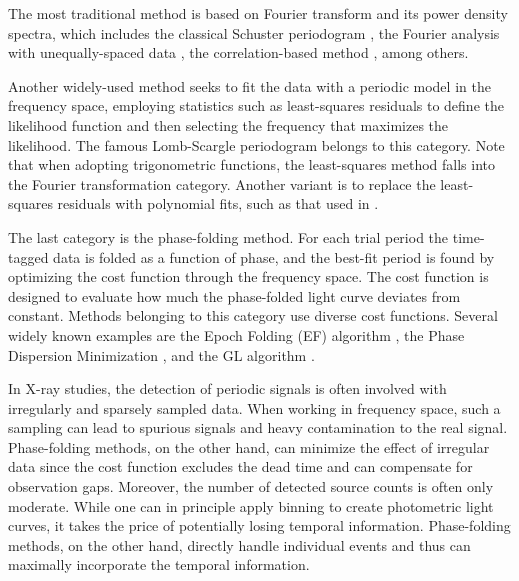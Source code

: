 \documentclass[fleqn,usenatbib]{mnras}
\begin{document}
The most traditional method is based on Fourier transform and its power density spectra, which includes the classical Schuster periodogram \citep{1898TeMag...3...13S}, the Fourier analysis with unequally-spaced data \citep{1975Ap&SS..36..137D}, the correlation-based method \citep{1988ApJ...333..646E}, among others.

Another widely-used method seeks to fit the data with a periodic model in the frequency space, employing statistics such as least-squares residuals to define the likelihood function and then selecting the frequency that maximizes the likelihood. The famous Lomb-Scargle periodogram \citep[hereafter LS]{1976Ap&SS..39..447L,1982ApJ...263..835S} belongs to this category. Note that when adopting trigonometric functions, the least-squares method falls into the Fourier transformation category. Another variant is to replace the least-squares residuals with polynomial fits, such as that used in \citet{1996ApJ...460L.107S}.

The last category is the phase-folding method. For each trial period the time-tagged data is folded as a function of phase, and the best-fit period is found by optimizing the cost function through the frequency space. The cost function is designed to evaluate how much the phase-folded light curve deviates from constant.
Methods belonging to this category use diverse cost functions. Several widely known examples are the Epoch Folding (EF) algorithm \citep{1983ApJ...266..160L}, the Phase Dispersion Minimization \citep{1978ApJ...224..953S}, and the GL algorithm \citep{1992ApJ...398..146G}.

In X-ray studies, the detection of periodic signals is often involved with irregularly and sparsely sampled data. 
When working in frequency space, such a sampling can lead to spurious signals and heavy contamination to the real signal. Phase-folding methods, on the other hand, can minimize the effect of irregular data since the cost function excludes the dead time and can compensate for observation gaps.
Moreover, the number of detected source counts is often only moderate. While one can in principle apply binning to create photometric light curves, it takes the price of potentially losing temporal information. Phase-folding methods, on the other hand, directly handle individual events and thus can maximally incorporate the temporal information.
\end{document}
